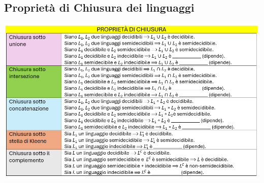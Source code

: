 \documentclass{article}  %
\theoremstyle{definition}
\begin{document}
\subsection{Proprietà di Chiusura dei linguaggi}
\begin{center}
	\includegraphics[width=0.9\linewidth]{chiusura-linguaggi.png}
\end{center}
\end{document}
